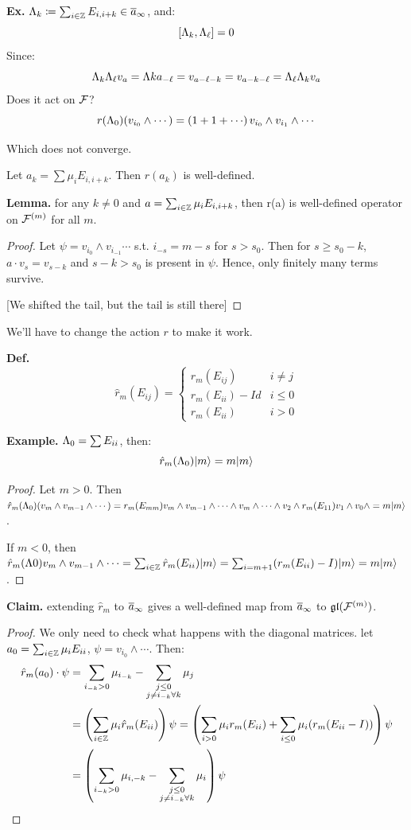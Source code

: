 \documentclass[]{../../../../tex/classes/styledArticle}
\newcommand\gl {\mathfrak{gl}}
\begin{document}
	\textbf{Ex. }$\Lambda_k \coloneqq \sum_{i \in \mathbb{Z}} E_{i, i + k} \in \overline a_\infty$, and:
	\[ [\Lambda_k, \Lambda_\ell] = 0 \]
	Since: 
	\[ \Lambda_k\Lambda_\ell v_a = \Lambda k a_{-\ell} = v_{a - \ell - k} = v_{a - k - \ell} = \Lambda_\ell \Lambda _k v_a \]
	Does it act on $\mathcal{F}$? 
	\[ r(\Lg_0)(v_{i_0} \land \cdots) = \cl{1 + 1 + \cdots}v_{i_0} \land v_{i_1} \land \cdots \]
	
	Which does not converge. 
	
	Let $a_k = \sum \mu_i E_{i, i + k}$. Then $r(a_k)$ is well-defined. 
	
	\textbf{Lemma. }for any $k \neq 0$ and $a = \sum_{i \in \mathbb{Z}}\mu_i E_{i, i + k}$, then r(a) is well-defined operator on $\mathcal{F}^{(m)}$ for all $m$. \begin{proof}
		Let $\psi = v_{i_0} \land v_{i_{-1}} \cdots$ s.t. ${i_{-s}} = m - s$ for $s > s_0$. Then for $s \ge s_0 - k$, $a \cdot v_{s} = v_{s -k}$ and $s - k > s_0$ is present in $\psi$. Hence, only finitely many terms survive. 
		
		[We shifted the tail, but the tail is still there]
	\end{proof}
	
	We'll have to change the action $r$ to make it work. 
	
	\textbf{Def. }
	\[ \hat r_m(E_{ij}) = \begin{cases}
		r_m(E_{ij}) & i \neq j \\
		r_m(E_{ii}) - Id & i \le 0 \\
		r_m(E_{ii}) & i > 0
	\end{cases} \]
	
	\textbf{Example. }$\Lambda_0 = \sum E_{ii}$, then: 
	\[ \hat r_m(\Lambda_0)|m \rangle = m | m \rangle \]
	\begin{proof}
		Let $m > 0$. Then $\hat r_m(\Lambda_0)(v_m \land v_{m -1} \land \cdots) = r_m(E_{mm})v_m \land v_{m- 1} \land \cdots \land v_m \land \cdots \land v_2 \land r_m(E_{11})v_1 \land v_0 \land = m |m \rangle$. 
		
		If $m < 0$, then $\hat r_m(\Lambda 0) v_m \land v_{m - 1} \land \cdots  = \sum_{i \in \mathbb{Z}}\hat r_m(E_{ii})|m\rangle = \sum_{i = m + 1} (r_m(E_{ii}) - I) |m\rangle = m |m\rangle$. 
	\end{proof}
	
	\textbf{Claim. }extending $\hat r_m $ to $\overline a_{\infty}$ gives a well-defined map from $\overline a_\infty $ to $\gl(\fc^{(m)})$. \begin{proof}
		We only need to check what happens with the diagonal matrices. let $a_0 = \sum_{i \in \mathbb{Z}}\mu_i E_{ii}$, $\psi = v_{i_0} \land \cdots$. Then: 
		\begin{align*}
			\hat r_m(a_0) \cdot \psi &= \sum_{i_{-k} > 0} \mu_{i_{-k}} - \sum_{\substack{j \le0 \\ j \neq i_{-k} \forall k}}\mu_j \\
			&= \left ( \sum_{i \in \mathbb{Z}}\mu_i \hat r_m(E_{ii}) \right ) \psi = \left ( \sum_{i > 0}\mu_i r_m(E_{ii}) + \sum_{i \le 0}\mu_i(r_m(E_{ii} - I)) \right )\psi \\
			&=\left ( \sum_{i_{-k} > 0}\mu_{i, -k} - \sum_{\substack{j \le0 \\ j \neq i_{-k} \forall k}} \mu_i \right )\psi
		\end{align*}
	\end{proof}
	
\end{document}
